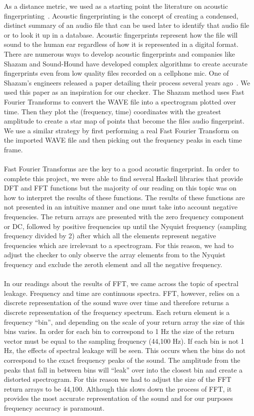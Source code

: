 \documentclass[english, 11pt]{article}
\begin{document}
As a distance metric, we used as a starting point the literature on acoustic fingerprinting~\cite{fingerprinting}. Acoustic fingerprinting is the concept of creating a condensed, distinct summary of an audio file that can be used later to identify that audio file or to look it up in a database. Acoustic fingerprints represent how the file will sound to the human ear regardless of how it is represented in a digital format. There are numerous ways to develop acoustic fingerprints and companies like Shazam and Sound-Hound have developed complex algorithms to create accurate fingerprints even from low quality files recorded on a cellphone mic. One of Shazam's engineers released a paper detailing their process several years ago~\cite{Shazam}. We used this paper as an inspiration for our checker. The Shazam method uses Fast Fourier Transforms to convert the WAVE file into a spectrogram plotted over time. Then they plot the (frequency, time) coordinates with the greatest amplitude to create a star map of points that become the files audio fingerprint. We use a similar strategy by first performing a real Fast Fourier Transform on the imported WAVE file and then picking out the frequency peaks in each time frame. \\ \\
Fast Fourier Transforms are the key to a good acoustic fingerprint. In order to complete this project, we were able to find several Haskell libraries that provide DFT and FFT functions but the majority of our reading on this topic was on how to interpret the results of these functions. The results of these functions are not presented in an intuitive manner and one must take into account negative frequencies. The return arrays are presented with the zero frequency component or DC, followed by positive frequencies up until the Nyquist frequency (sampling frequency divided by 2) after which all the elements represent negative frequencies which are irrelevant to a spectrogram. For this reason, we had to adjust the checker to only observe the array elements from to the Nyquist frequency and exclude the zeroth element and all the negative frequency. \\ \\
In our readings about the results of FFT, we came across the topic of spectral leakage. Frequency and time are continuous spectra. FFT, however, relies on a discrete representation of the sound wave over time and therefore returns a discrete representation of the frequency spectrum. Each return element is a frequency ``bin'', and depending on the scale of your return array the size of this bins varies. In order for each bin to correspond to 1 Hz the size of the return vector must be equal to the sampling frequency (44,100 Hz). If each bin is not 1 Hz, the effects of spectral leakage will be seen. This occurs when the bins do not correspond to the exact frequency peaks of the sound. The amplitude from the peaks that fall in between bins will ``leak'' over into the closest bin and create a distorted spectrogram. For this reason we had to adjust the size of the FFT return arrays to be 44,100. Although this slows down the process of FFT, it provides the most accurate representation of the sound and for our purposes frequency accuracy is paramount. \\ \\
\end{document}
